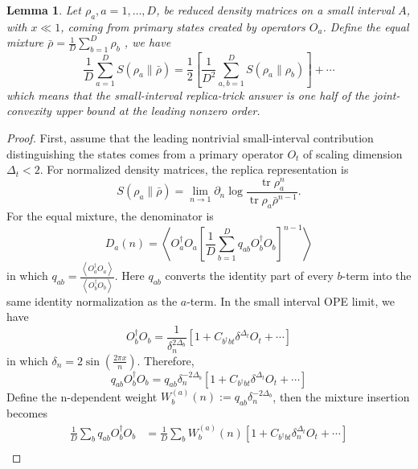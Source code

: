 \documentclass{article}
\theoremstyle{plain}
\theoremstyle{definition}
\theoremstyle{plain}
\newtheorem{lemma}[theorem]{Lemma}
\begin{document}
\begin{lemma}
Let $\rho_a, a=1, \ldots, D$, be reduced density matrices on a small interval $A$, with $x\ll 1$, coming from primary states created by operators $O_a$. Define the equal mixture $\bar{\rho}=\frac{1}{D} \sum_{b=1}^D \rho_b$ , we have
\begin{equation}
    \frac{1}{D} \sum_{a=1}^D S\left(\rho_a \| \bar{\rho}\right)=\frac{1}{2}\left[\frac{1}{D^2} \sum_{a, b=1}^D S\left(\rho_a \| \rho_b\right)\right]+\cdots
\end{equation}
which means that the small-interval replica-trick answer is one half of the joint-convexity upper bound at the leading nonzero order.
\end{lemma}
\begin{proof}
First, assume that the leading nontrivial small-interval contribution distinguishing the states comes from a primary operator $O_t$ of scaling dimension $\Delta_t<2$. For normalized density matrices, the replica representation is
\begin{equation}
  S\left(\rho_a \| \bar{\rho}\right)=\lim _{n \rightarrow 1} \partial_n \log \frac{\operatorname{tr} \rho_a^n}{\operatorname{tr} \rho_a \bar{\rho}^{n-1}} .  
\end{equation}
For the equal mixture, the denominator is
\begin{equation}
    D_a(n)=\left\langle O_a^{\dagger} O_a\left[\frac{1}{D} \sum_{b=1}^D q_{a b} O_b^{\dagger} O_b\right]^{n-1}\right\rangle
\end{equation}
in which $q_{a b}=\frac{\left\langle O_a^{\dagger} O_a\right\rangle}{\left\langle O_b^{\dagger} O_b\right\rangle}$. Here $q_{a b}$ converts the identity part of every $b$-term into the same identity normalization as the $a$-term. In the small interval OPE limit, we have
\begin{equation}
O_b^{\dagger} O_b=\frac{1}{\delta_n^{2 \Delta_b}}\left[1+C_{b^{\dagger} b t} \delta^{\Delta_t} O_t+\cdots\right]
\end{equation}
in which $\delta_n=2\sin(\frac{2\pi x}{n})$. Therefore,
\begin{equation}
    q_{a b} O_b^{\dagger} O_b=q_{a b} \delta_n^{-2 \Delta_b}\left[1+C_{b^{\dagger} b t} \delta^{\Delta_t} O_t+\cdots\right]
\end{equation}
Define the n-dependent weight $W_b^{(a)}(n):=q_{a b} \delta_n^{-2 \Delta_b}$, then the mixture insertion becomes
\begin{equation}
\begin{aligned}
\frac{1}{D} \sum_b q_{a b} O_b^{\dagger} O_b&=\frac{1}{D} \sum_b W_b^{(a)}(n)\left[1+C_{b^{\dagger} b t} \delta_n^{\Delta_t} O_t+\cdots\right]\\

\end{aligned}
\end{equation}
\end{proof}
\end{document}
